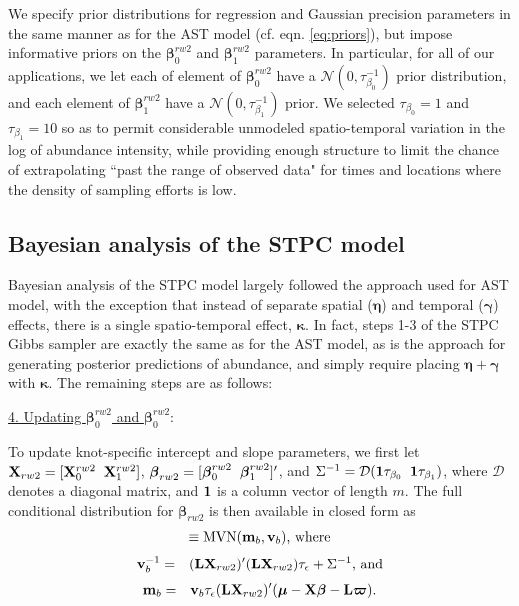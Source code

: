\documentclass[12pt,fleqn]{article}
\begin{document}
\begin{flushleft}
We specify prior distributions for regression and Gaussian precision parameters in the same manner as for the AST model (cf. eqn. \ref{eq:priors}), but impose informative priors on the $\boldsymbol{\beta}_0^{rw2}$ and $\boldsymbol{\beta}_1^{rw2}$ parameters.  In particular, for all of our applications, we let each of element of $\boldsymbol{\beta}_0^{rw2}$ have a $\mathcal{N}(0,\tau_{\beta_0}^{-1})$ prior distribution, and each element of $\boldsymbol{\beta}_1^{rw2}$ have a $\mathcal{N}(0,\tau_{\beta_1}^{-1})$ prior.  We selected $\tau_{\beta_0} = 1$ and $\tau_{\beta_1} = 10$ so as to permit considerable unmodeled spatio-temporal variation in the log of abundance intensity, while providing enough structure to limit the chance of extrapolating ``past the range of observed data" for times and locations where the density of sampling efforts is low.

\subsection{Bayesian analysis of the STPC model}

Bayesian analysis of the STPC model largely followed the approach used for AST model, with the exception that instead of separate spatial ($\boldsymbol{\eta}$) and temporal ($\boldsymbol{\gamma}$) effects, there is a single spatio-temporal effect, $\boldsymbol{\kappa}$.  In fact, steps 1-3 of the STPC Gibbs sampler are exactly the same as for the AST model, as is the approach for generating posterior predictions of abundance, and simply require placing $\boldsymbol{\eta}+\boldsymbol{\gamma}$ with $\boldsymbol{\kappa}$.  The remaining steps are as follows:

\underline{4. Updating $\boldsymbol{\beta}_0^{rw2}$ and $\boldsymbol{\beta}_0^{rw2}$}:

To update knot-specific intercept and slope parameters, we first let ${\bf X}_{rw2} = [{\bf X}_0^{rw2} \hspace{2mm} {\bf X}_1^{rw2}]$, $\boldsymbol{\beta}_{rw2}=[\boldsymbol{\beta}_0^{rw2} \hspace{2mm} \boldsymbol{\beta}_1^{rw2}]^\prime$, and $\Sigma^{-1} = \mathcal{D}({\bf 1} \tau_{\beta_0} \hspace{2mm} {\bf 1} \tau_{\beta_1})$, where $\mathcal{D}$ denotes a diagonal matrix, and ${\bf 1}$ is a column vector of length $m$. The full conditional distribution for $\boldsymbol{\beta}_{rw2}$ is then available in closed form as
\begin{eqnarray*}
  [\boldsymbol{\beta}_{rw2} | \cdot] \equiv \textrm{MVN}({\bf m}_{b},{\bf v}_{b}) \text{, where}
\end{eqnarray*} 
\begin{eqnarray*}
  {\bf v}_{b}^{-1} & = & ({\bf L}{\bf X}_{rw2})^\prime ({\bf L}{\bf X}_{rw2}) \tau_\epsilon + \Sigma^{-1} \text{, and}
\end{eqnarray*} 
\begin{eqnarray*}
  {\bf m}_{b} & = & {\bf v}_b \tau_\epsilon ({\bf L}{\bf X}_{rw2})^\prime (\boldsymbol{\mu}- {\bf X} \boldsymbol{\beta} - {\bf L} \boldsymbol{\varpi}).
\end{eqnarray*} 


\end{flushleft}
\end{document}
